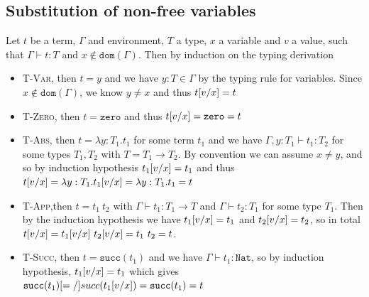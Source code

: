 \documentclass{article}
\newcommand{\subst}[3]{\ensuremath #1[#2/#3]}
\begin{document}
\subsection*{Substitution of non-free variables}
Let $t$ be a term, $\Gamma$ and environment, $T$ a type, $x$ a variable and $v$ a value, such that $\Gamma \vdash t:T$ and $x\notin \mathtt{dom}(\Gamma)$. 
Then by induction on the typing derivation
\begin{itemize}
\item \textsc{T-Var}, then $t=y$ and we have $y:T\in\Gamma$ by the typing rule for variables.
Since $x\notin\mathtt{dom}(\Gamma)$, we know $y\neq x$ and thus $\subst{t}{v}{x} = t$
\item \textsc{T-Zero}, then $t=\mathtt{zero}$ and thus $\subst{t}{v}{x} = \mathtt{zero} = t$ 
\item \textsc{T-Abs}, then $t= \lambda y:T_1.t_1$ for some term $t_1$ and we have $\Gamma,y:T_1\vdash t_1:T_2$ for some types $T_1,T_2$ with $T=T_1\rightarrow T_2$. 
By convention we can assume $x\neq y$, and so by induction hypothesis $\subst{t_1}{v}{x} = t_1$ and thus $\subst{t}{v}{x} = \lambda y:T_1.\subst{t_1}{v}{x} = \lambda y:T_1.t_1 = t$
\item \textsc{T-App},then $t=t_1\ t_2$ with $\Gamma \vdash t_1:T_1\rightarrow T$ and $\Gamma \vdash t_2:T_1$ for some type $T_1$. 
Then by the induction hypothesis we have $\subst{t_1}{v}{x} = t_1$ and $\subst{t_2}{v}{x} = t_2$, so in total $\subst{t}{v}{x} = \subst{t_1}{v}{x}\ \subst{t_2}{v}{x} = t_1\ t_2 = t$.
\item \textsc{T-Succ}, then $t = \mathtt{succ}(t_1)$ and we have $\Gamma \vdash t_1:\mathtt{Nat}$, so by induction hypothesis, $\subst{t_1}{v}{x} = t_1$ which gives $\subst{\mathtt{succ}(t_1)} = \mathtt{succ}(\subst{t_1}{v}{x}) = \mathtt{succ}(t_1) = t$
\end{itemize}
\end{document}

